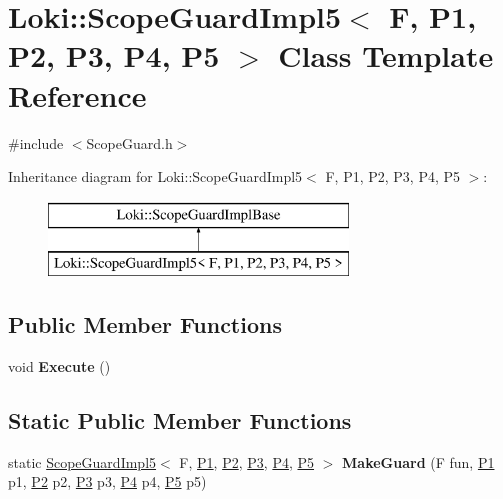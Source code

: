 \hypertarget{classLoki_1_1ScopeGuardImpl5}{}\section{Loki\+:\+:Scope\+Guard\+Impl5$<$ F, P1, P2, P3, P4, P5 $>$ Class Template Reference}
\label{classLoki_1_1ScopeGuardImpl5}


{\ttfamily \#include $<$Scope\+Guard.\+h$>$}

Inheritance diagram for Loki\+:\+:Scope\+Guard\+Impl5$<$ F, P1, P2, P3, P4, P5 $>$\+:\begin{figure}[H]
\begin{center}
\leavevmode
\includegraphics[height=2.000000cm]{classLoki_1_1ScopeGuardImpl5}
\end{center}
\end{figure}
\subsection*{Public Member Functions}
\begin{DoxyCompactItemize}
\item 
\hypertarget{classLoki_1_1ScopeGuardImpl5_a6dddabe0a197bacc83b50063a4ee5822}{}void {\bfseries Execute} ()\label{classLoki_1_1ScopeGuardImpl5_a6dddabe0a197bacc83b50063a4ee5822}

\end{DoxyCompactItemize}
\subsection*{Static Public Member Functions}
\begin{DoxyCompactItemize}
\item 
\hypertarget{classLoki_1_1ScopeGuardImpl5_af4d76ad7f386467ddfb9541bad9088ec}{}static \hyperlink{classLoki_1_1ScopeGuardImpl5}{Scope\+Guard\+Impl5}$<$ F, \hyperlink{structP1}{P1}, \hyperlink{structP2}{P2}, \hyperlink{structP3}{P3}, \hyperlink{structP4}{P4}, \hyperlink{structP5}{P5} $>$ {\bfseries Make\+Guard} (F fun, \hyperlink{structP1}{P1} p1, \hyperlink{structP2}{P2} p2, \hyperlink{structP3}{P3} p3, \hyperlink{structP4}{P4} p4, \hyperlink{structP5}{P5} p5)\label{classLoki_1_1ScopeGuardImpl5_af4d76ad7f386467ddfb9541bad9088ec}

\end{DoxyCompactItemize}
